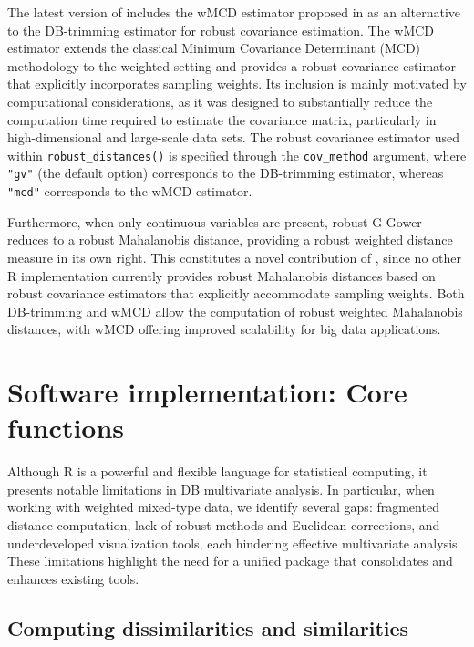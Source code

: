 The latest version of  includes the wMCD estimator proposed in \cite{Boj2026} as an alternative to the DB-trimming estimator for robust covariance estimation. The wMCD estimator extends the classical Minimum Covariance Determinant (MCD) methodology to the weighted setting and provides a robust covariance estimator that explicitly incorporates sampling weights. Its inclusion is mainly motivated by computational considerations, as it was designed to substantially reduce the computation time required to estimate the covariance matrix, particularly in high-dimensional and large-scale data sets. The robust covariance estimator used within \texttt{robust\_distances()} is specified through the \texttt{cov\_method} argument, where \texttt{"gv"} (the default option) corresponds to the DB-trimming estimator, whereas \texttt{"mcd"} corresponds to the wMCD estimator.

Furthermore, when only continuous variables are present, robust G-Gower reduces to a robust Mahalanobis distance, providing a robust weighted distance measure in its own right. This constitutes a novel contribution of , since no other R implementation currently provides robust Mahalanobis distances based on robust covariance estimators that explicitly accommodate sampling weights. Both DB-trimming and wMCD allow the computation of robust weighted Mahalanobis distances, with wMCD offering improved scalability for big data applications.

\section{Software implementation: Core functions}
\label{sec.software}

Although R is a powerful and flexible language for statistical computing, it presents notable limitations in DB multivariate analysis. In particular, when working with weighted mixed-type data, we identify several gaps: fragmented distance computation, lack of robust methods and Euclidean corrections, and underdeveloped visualization tools, each hindering effective multivariate analysis. These limitations highlight the need for a unified  package that consolidates and enhances existing tools.

\subsection{Computing dissimilarities and similarities}


